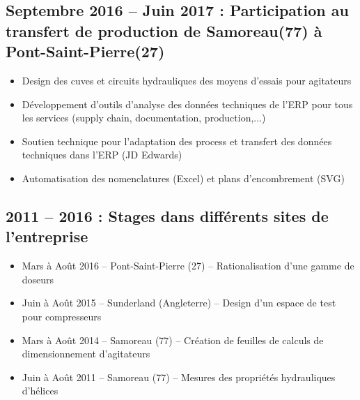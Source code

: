 \documentclass[10pt,a4paper,sans]{article}
\begin{document}
\begin{minipage}[t]{0.68\textwidth}
    \subsection{Septembre 2016 -- Juin 2017 : Participation au transfert de production de Samoreau(77) à Pont-Saint-Pierre(27)}
    \begin{itemize}
        \item{Design des cuves et circuits hydrauliques des moyens d’essais pour agitateurs}
        \item{Développement d’outils d’analyse des données techniques de l’ERP pour tous les services (supply chain, documentation, production,...)}
        \item{Soutien technique pour l’adaptation des process et transfert des données techniques dans l’ERP (JD Edwards)}
        \item{Automatisation des nomenclatures (Excel) et plans d’encombrement (SVG)}
    \end{itemize}


    \subsection{2011 -- 2016 : Stages dans différents sites de l'entreprise}
    \begin{itemize}
        \item{Mars à Août 2016 -- Pont-Saint-Pierre (27) -- Rationalisation d’une gamme de doseurs}
        \item{Juin à Août 2015 -- Sunderland (Angleterre) -- Design d’un espace de test pour compresseurs}
        \item{Mars à Août 2014 -- Samoreau (77) -- Création de feuilles de calculs de dimensionnement d’agitateurs}
        \item{Juin à Août 2011 -- Samoreau (77) -- Mesures des propriétés hydrauliques d’hélices}
    \end{itemize}
\end{minipage}
\end{document}
